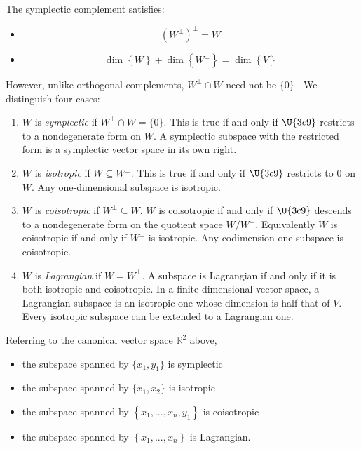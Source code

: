 \documentclass{conm-p-l}
\theoremstyle{definition}
\theoremstyle{remark}
\numberwithin{equation}{section}
\theoremstyle{plain}
\begin{document}
The symplectic complement satisfies:

\begin{itemize}
\item 
\begin{equation}
\left( W^{\bot }\right) ^{\bot }=W
\end{equation}

\item 
\begin{equation}
\dim \left\{ W\right\} +\dim \left\{ W^{\bot }\right\} =\dim \left\{
V\right\} 
\end{equation}
\end{itemize}

However, unlike orthogonal complements, $W^{\bot }\cap W$ need not be $\{0\}$%
. We distinguish four cases:

\begin{enumerate}
\item $W$ is \emph{symplectic} if $W^{\bot }\cap W=\{0\}$. This is true if
and only if $\U{3c9} $ restricts to a nondegenerate form on $W$. A
symplectic subspace with the restricted form is a symplectic vector space in
its own right.

\item $W$ is \emph{isotropic} if $W\subseteq W^{\bot }$. This is true if and
only if $\U{3c9} $ restricts to $0$ on $W$. Any one-dimensional subspace is
isotropic.

\item $W$ is \emph{coisotropic} if $W^{\bot }\subseteq W$. $W$ is
coisotropic if and only if $\U{3c9} $ descends to a nondegenerate form on
the quotient space $W/W^{\bot }$. Equivalently $W$ is coisotropic if and
only if $W^{\bot }$ is isotropic. Any codimension-one subspace is
coisotropic.

\item $W$ is \emph{Lagrangian} if $W=W^{\bot }$. A subspace is Lagrangian if
and only if it is both isotropic and coisotropic. In a finite-dimensional
vector space, a Lagrangian subspace is an isotropic one whose dimension is
half that of $V$. Every isotropic subspace can be extended to a Lagrangian
one.
\end{enumerate}

Referring to the canonical vector space $\mathbb{R}^{2}$ above,

\begin{itemize}
\item the subspace spanned by $\{x_{1},y_{1}\}$ is symplectic

\item the subspace spanned by $\{x_{1},x_{2}\}$ is isotropic

\item the subspace spanned by $\left\{ x_{1},...,x_{n},y_{1}\right\} $ is
coisotropic

\item the subspace spanned by $\left\{ x_{1},...,x_{n}\right\} $ is
Lagrangian.
\end{itemize}
\end{document}
